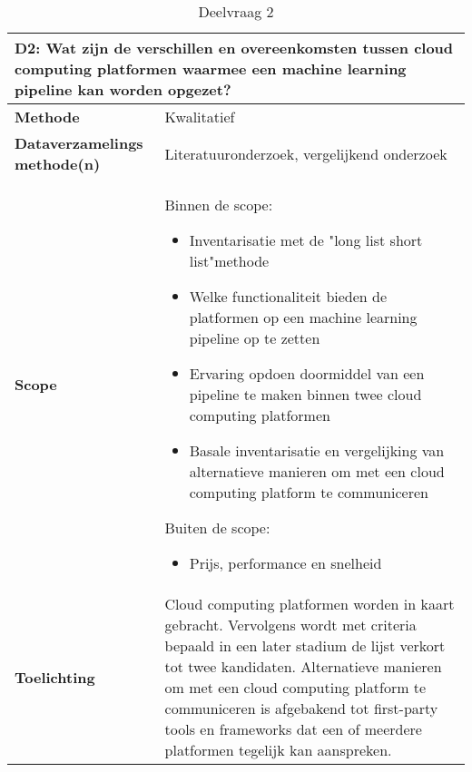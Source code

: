 {\begin{table}[hbt!]
\centering
\begin{tabular}{|p{.215\linewidth}|p{.72\linewidth}|}
\hline
\multicolumn{2}{|p{.97\linewidth}|}{\textbf{D2: Wat zijn de verschillen en overeenkomsten tussen cloud computing platformen waarmee een machine learning pipeline kan worden opgezet?}} \\ \hline
  \textbf{Methode}&
    Kwalitatief
  \\ \hline
  \textbf{Dataverzamelings methode(n)}&
    Literatuuronderzoek, vergelijkend onderzoek
  \\ \hline
  \textbf{Scope}&
    Binnen de scope:
    \begin{itemize}
      \item Inventarisatie met de "long list short list"\space methode
      \item Welke functionaliteit bieden de platformen op een machine learning pipeline op te zetten
      \item Ervaring opdoen doormiddel van een pipeline te maken binnen twee cloud computing platformen
      \item Basale inventarisatie en vergelijking van alternatieve manieren om met een cloud computing platform te communiceren
    \end{itemize}
    Buiten de scope:
    \begin{itemize}
      \item Prijs, performance en snelheid
    \end{itemize}
  \\ \hline
  \textbf{Toelichting}&
    Cloud computing platformen worden in kaart gebracht. Vervolgens wordt met criteria bepaald in een later stadium de lijst verkort tot twee kandidaten. Alternatieve manieren om met een cloud computing platform te communiceren is afgebakend tot first-party tools en frameworks dat een of meerdere platformen tegelijk kan aanspreken.
  \\ \hline
\end{tabular}
\caption{Deelvraag 2}
\label{table:sq2}
\end{table}

}
